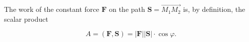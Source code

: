 The work of the constant force $\mathbf{F}$ on the path $\mathbf{S} = \overrightarrow{M_1 M_2}$ is, by definition, the scalar product

$$A = (\mathbf{F}, \mathbf{S}) = |\mathbf{F}||\mathbf{S}| \cdot \cos \varphi.$$
